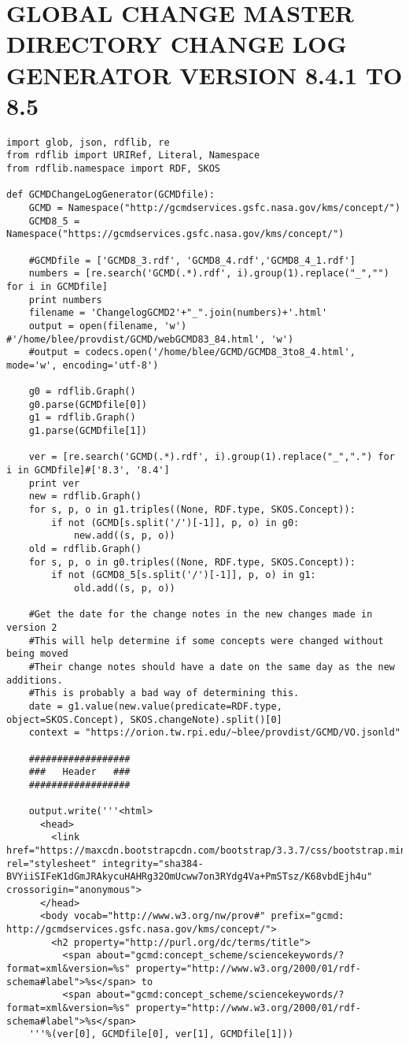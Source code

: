 \chapter{GLOBAL CHANGE MASTER DIRECTORY CHANGE LOG GENERATOR VERSION 8.4.1 TO 8.5}
\begin{verbatim}
import glob, json, rdflib, re
from rdflib import URIRef, Literal, Namespace
from rdflib.namespace import RDF, SKOS

def GCMDChangeLogGenerator(GCMDfile):
	GCMD = Namespace("http://gcmdservices.gsfc.nasa.gov/kms/concept/")
	GCMD8_5 = Namespace("https://gcmdservices.gsfc.nasa.gov/kms/concept/")
	
	#GCMDfile = ['GCMD8_3.rdf', 'GCMD8_4.rdf','GCMD8_4_1.rdf']
	numbers = [re.search('GCMD(.*).rdf', i).group(1).replace("_","") for i in GCMDfile]
	print numbers
	filename = 'ChangelogGCMD2'+"_".join(numbers)+'.html'
	output = open(filename, 'w') #'/home/blee/provdist/GCMD/webGCMD83_84.html', 'w')
	#output = codecs.open('/home/blee/GCMD/GCMD8_3to8_4.html', mode='w', encoding='utf-8')
	
	g0 = rdflib.Graph()
	g0.parse(GCMDfile[0])
	g1 = rdflib.Graph()
	g1.parse(GCMDfile[1])
	
	ver = [re.search('GCMD(.*).rdf', i).group(1).replace("_",".") for i in GCMDfile]#['8.3', '8.4']
	print ver
	new = rdflib.Graph()
	for s, p, o in g1.triples((None, RDF.type, SKOS.Concept)):
		if not (GCMD[s.split('/')[-1]], p, o) in g0:
			new.add((s, p, o))
	old = rdflib.Graph()
	for s, p, o in g0.triples((None, RDF.type, SKOS.Concept)):
		if not (GCMD8_5[s.split('/')[-1]], p, o) in g1:
			old.add((s, p, o))
	
	#Get the date for the change notes in the new changes made in version 2
	#This will help determine if some concepts were changed without being moved
	#Their change notes should have a date on the same day as the new additions.
	#This is probably a bad way of determining this.
	date = g1.value(new.value(predicate=RDF.type, object=SKOS.Concept), SKOS.changeNote).split()[0]
	context = "https://orion.tw.rpi.edu/~blee/provdist/GCMD/VO.jsonld"
	
	##################
	###   Header   ###
	##################
	
	output.write('''<html>
	  <head>
	    <link href="https://maxcdn.bootstrapcdn.com/bootstrap/3.3.7/css/bootstrap.min.css" rel="stylesheet" integrity="sha384-BVYiiSIFeK1dGmJRAkycuHAHRg32OmUcww7on3RYdg4Va+PmSTsz/K68vbdEjh4u" crossorigin="anonymous">
	  </head>
	  <body vocab="http://www.w3.org/nw/prov#" prefix="gcmd: http://gcmdservices.gsfc.nasa.gov/kms/concept/">
	    <h2 property="http://purl.org/dc/terms/title">
	      <span about="gcmd:concept_scheme/sciencekeywords/?format=xml&version=%s" property="http://www.w3.org/2000/01/rdf-schema#label">%s</span> to 
	      <span about="gcmd:concept_scheme/sciencekeywords/?format=xml&version=%s" property="http://www.w3.org/2000/01/rdf-schema#label">%s</span>
	'''%(ver[0], GCMDfile[0], ver[1], GCMDfile[1]))
	

\end{verbatim}
